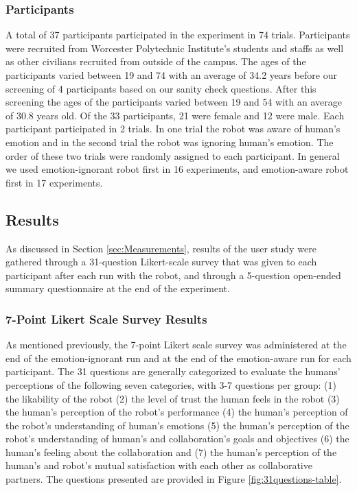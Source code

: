 \documentclass[12pt]{report}
\begin{document}
\subsubsection{Participants}
\label{sec:Participants}
A total of 37 participants participated in the experiment in 74 trials.
Participants were recruited from Worcester Polytechnic Institute's students and
staffs as well as other civilians recruited from outside of the campus. The ages
of the participants varied between 19 and 74 with an average of 34.2 years
before our screening of 4 participants based on our sanity check questions. After
this screening the ages of the participants varied between 19 and 54 with an
average of 30.8 years old. Of the 33 participants, 21 were female and 12
were male. Each participant participated in 2 trials. In one trial the robot was
aware of human's emotion and in the second trial the robot was ignoring human's
emotion. The order of these two trials were randomly assigned to each
participant. In general we used emotion-ignorant robot first in 16 experiments,
and emotion-aware robot first in 17 experiments.

\subsection{Results}

As discussed in Section \ref{sec:Measurements}, results of the user study were
gathered through a 31-question Likert-scale survey that was given to each
participant after each run with the robot, and through a 5-question open-ended
summary questionnaire at the end of the experiment.

\subsubsection{7-Point Likert Scale Survey Results}
As mentioned previously, the 7-point Likert scale survey was administered at
the end of the emotion-ignorant run and at the end of the emotion-aware run for
each participant. The 31 questions are generally categorized to evaluate the
humans' perceptions of the following seven categories, with 3-7 questions per
group: (1) the likability of the robot (2) the level of trust the human feels
in the robot (3) the human's perception of the robot's performance (4) the
human's perception of the robot's understanding of human's emotions (5) the
human's perception of the robot's understanding of human's and collaboration's
goals and objectives (6) the human's feeling about the collaboration and (7)
the human's perception of the human's and robot's mutual satisfaction with each
other as collaborative partners. The questions presented are provided in Figure
\ref{fig:31questions-table}.
\end{document}
